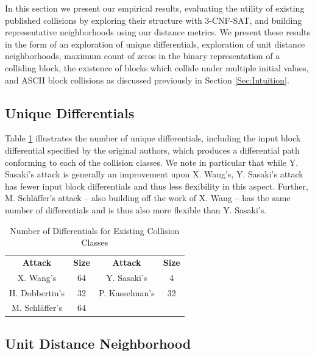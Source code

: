 \documentclass[conference]{IEEEtran}
\begin{document}
In this section we present our empirical results, evaluating the
utility of existing published collisions by exploring their structure
with 3-CNF-SAT, and building representative neighborhoods using our
distance metrics.  We present these results in the form of an
exploration of unique differentials, exploration of unit distance
neighborhoods, maximum count of zeros in the binary representation of
a colliding block, the existence of blocks which collide under
multiple initial values, and ASCII block collisions as discussed
previously in Section \ref{Sec:Intuition}.

\subsection{Unique Differentials} \label{empirical:differentials}

Table \ref{table:differentials} illustrates the number of unique differentials,
including the input block differential specified by the original authors, which produces a differential path conforming to
each of the collision classes. We note in particular that while Y. Sasaki's
attack is generally an improvement upon X. Wang's, Y. Sasaki's attack has fewer
input block differentials and thus less flexibility in this aspect. Further,
M. Schl{\"a}ffer's attack -- also building off the work of X. Wang -- has the
same number of differentials and is thus also more flexible than Y. Sasaki's.

\begin{table}
    \caption{Number of Differentials for Existing Collision Classes}
    \label{table:differentials}
    \begin{tabular}{c c c c}
        \textbf{Attack} & \textbf{Size} & \textbf{Attack} & \textbf{Size} \\
        X. Wang's & 64 & Y. Sasaki's & 4 \\
        H. Dobbertin's & 32 & P. Kasselman's & 32 \\
        M. Schl{\"a}ffer's & 64 & & \\
    \end{tabular}
\end{table}

\subsection{Unit Distance Neighborhood} \label{empirical:neighborhood}
\end{document}
